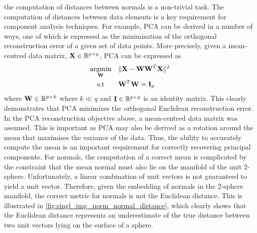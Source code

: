 the computation of distances between normals is a non-trivial task. The
computation of distances between data elements is a key requirement for
component analysis techniques. For example, PCA can be derived in a number of
ways, one of which is expressed as the minimisation of the orthogonal
reconstruction error of a given set of data points. More precisely, given
a mean-centred data matrix, $\boldsymbol{\mathbf{X}} \in \mathbb{R}^{p \times q}$, PCA can be expressed
as
\begin{equation*}
\begin{alignedat}{2}
	&\argmin_{\bb{W}} \quad &&\lVert \bb{X} - \bb{W} \bb{W}^T \bb{X} \rVert^2 \\
	&\quad \, \st      &&\bb{W}^T \bb{W} = \bb{I}_p
\end{alignedat}
\end{equation*}
where $\boldsymbol{\mathbf{W}} \in \mathbb{R}^{p \times k}$ where $k \ll q$ and
$\boldsymbol{\mathbf{I}} \in \mathbb{R}^{p \times p}$ is an identity matrix. This clearly demonstrates
that PCA minimizes the orthogonal Euclidean reconstruction error. In the PCA
reconstruction objective above, a mean-centred data matrix was assumed. This is
important as PCA may also be derived as a rotation around the mean that
maximises the variance of the data. Thus, the ability to accurately compute the
mean is an important requirement for correctly recovering principal components.
For normals, the computation of a correct mean
is complicated by the constraint that the mean normal must also lie on the
manifold of the unit 2-sphere. Unfortunately, a linear combination of unit
vectors is not guaranteed to yield a unit vector. 
Therefore, given the embedding of normals
in the 2-sphere manifold, the correct metric for normals is not the Euclidean
distance. This is illustrated in
\cref{fig:singl_img_norm_normal_distance}, which clearly shows that the Euclidean
distance represents an underestimate of the true distance between two unit
vectors lying on the surface of a sphere.
